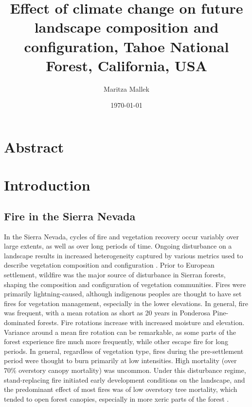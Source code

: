 \documentclass[12pt]{article}
\title{Effect of climate change on future landscape composition and configuration, Tahoe National Forest, California, USA}
\author{ Maritza Mallek }
\date{\today}
\begin{document}
\maketitle
\begin{spacing}{1}


\section{Abstract}

\section{Introduction}

\subsection{Fire in the Sierra Nevada}
In the Sierra Nevada, cycles of fire and vegetation recovery occur variably over large extents, as well as over long periods of time. Ongoing disturbance on a landscape results in increased heterogeneity captured by various metrics used to describe vegetation composition and configuration \citep{Monica2008}. Prior to European settlement, wildfire was the major source of disturbance in Sierran forests, shaping the composition and configuration of vegetation communities. Fires were primarily lightning-caused, although indigenous peoples are thought to have set fires for vegetation management, especially in the lower elevations. In general, fire was frequent, with a mean rotation as short as 20 years in Ponderosa Pine-dominated forests. Fire rotations increase with increased moisture and elevation. Variance around a mean fire rotation can be remarkable, as some parts of the forest experience fire much more frequently, while other escape fire for long periods. In general, regardless of vegetation type, fires during the pre-settlement period were thought to burn primarily at low intensities. High mortality (over 70\% overstory canopy mortality) was uncommon. Under this disturbance regime, stand-replacing fire initiated early development conditions on the landscape, and the predominant effect of most fires was of low overstory tree mortality, which tended to open forest canopies, especially in more xeric parts of the forest \citep{Mallek2013,Safford2014,SNEP1996,SNEP1996a}. 


\end{spacing}
\end{document}
